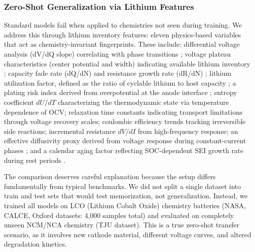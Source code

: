 \documentclass[5p,times,authoryear]{elsarticle}
\begin{document}
\subsubsection{Zero-Shot Generalization via Lithium Features}

 Standard models fail when applied to chemistries not seen during training. We address this through lithium inventory features: eleven physics-based variables that act as chemistry-invariant fingerprints. These include: differential voltage analysis (dV/dQ slope) correlating with phase transitions \citep{bloom2005differential}; voltage plateau characteristics (center potential and width) indicating available lithium inventory \citep{dubarry2017synthesize}; capacity fade rate (dQ/dN) and resistance growth rate (dR/dN) \citep{vetter2005ageing}; lithium utilization factor, defined as the ratio of cyclable lithium to host capacity \citep{birkl2017degradation}; a plating risk index derived from overpotential at the anode interface \citep{waldmann2014temperature}; entropy coefficient $dU/dT$ characterizing the thermodynamic state via temperature dependence of OCV; relaxation time constants indicating transport limitations through voltage recovery scales; coulombic efficiency trends tracking irreversible side reactions; incremental resistance $dV/dI$ from high-frequency response; an effective diffusivity proxy derived from voltage response during constant-current phases \citep{ecker2015parameterization}; and a calendar aging factor reflecting SOC-dependent SEI growth rate during rest periods \citep{keil2016calendar}.

The comparison deserves careful explanation because the setup differs fundamentally from typical benchmarks. We did not split a single dataset into train and test sets that would test memorization, not generalization. Instead, we trained all models on LCO (Lithium Cobalt Oxide) chemistry batteries (NASA, CALCE, Oxford datasets: 4,000 samples total) and evaluated on completely unseen NCM/NCA chemistry (TJU dataset). This is a true zero-shot transfer scenario, as it involves new cathode material, different voltage curves, and altered degradation kinetics.
\end{document}
